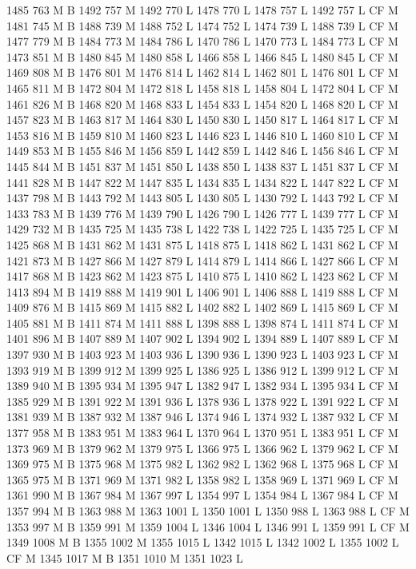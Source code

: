 {{{{{{{{{{{{{{{{{{{{{{{{{{{1485 763 M B
1492 757 M 1492 770 L
1478 770 L
1478 757 L
1492 757 L
CF M
1481 745 M B
1488 739 M 1488 752 L
1474 752 L
1474 739 L
1488 739 L
CF M
1477 779 M B
1484 773 M 1484 786 L
1470 786 L
1470 773 L
1484 773 L
CF M
1473 851 M B
1480 845 M 1480 858 L
1466 858 L
1466 845 L
1480 845 L
CF M
1469 808 M B
1476 801 M 1476 814 L
1462 814 L
1462 801 L
1476 801 L
CF M
1465 811 M B
1472 804 M 1472 818 L
1458 818 L
1458 804 L
1472 804 L
CF M
1461 826 M B
1468 820 M 1468 833 L
1454 833 L
1454 820 L
1468 820 L
CF M
1457 823 M B
1463 817 M 1464 830 L
1450 830 L
1450 817 L
1464 817 L
CF M
1453 816 M B
1459 810 M 1460 823 L
1446 823 L
1446 810 L
1460 810 L
CF M
1449 853 M B
1455 846 M 1456 859 L
1442 859 L
1442 846 L
1456 846 L
CF M
1445 844 M B
1451 837 M 1451 850 L
1438 850 L
1438 837 L
1451 837 L
CF M
1441 828 M B
1447 822 M 1447 835 L
1434 835 L
1434 822 L
1447 822 L
CF M
1437 798 M B
1443 792 M 1443 805 L
1430 805 L
1430 792 L
1443 792 L
CF M
1433 783 M B
1439 776 M 1439 790 L
1426 790 L
1426 777 L
1439 777 L
CF M
1429 732 M B
1435 725 M 1435 738 L
1422 738 L
1422 725 L
1435 725 L
CF M
1425 868 M B
1431 862 M 1431 875 L
1418 875 L
1418 862 L
1431 862 L
CF M
1421 873 M B
1427 866 M 1427 879 L
1414 879 L
1414 866 L
1427 866 L
CF M
1417 868 M B
1423 862 M 1423 875 L
1410 875 L
1410 862 L
1423 862 L
CF M
1413 894 M B
1419 888 M 1419 901 L
1406 901 L
1406 888 L
1419 888 L
CF M
1409 876 M B
1415 869 M 1415 882 L
1402 882 L
1402 869 L
1415 869 L
CF M
1405 881 M B
1411 874 M 1411 888 L
1398 888 L
1398 874 L
1411 874 L
CF M
1401 896 M B
1407 889 M 1407 902 L
1394 902 L
1394 889 L
1407 889 L
CF M
1397 930 M B
1403 923 M 1403 936 L
1390 936 L
1390 923 L
1403 923 L
CF M
1393 919 M B
1399 912 M 1399 925 L
1386 925 L
1386 912 L
1399 912 L
CF M
1389 940 M B
1395 934 M 1395 947 L
1382 947 L
1382 934 L
1395 934 L
CF M
1385 929 M B
1391 922 M 1391 936 L
1378 936 L
1378 922 L
1391 922 L
CF M
1381 939 M B
1387 932 M 1387 946 L
1374 946 L
1374 932 L
1387 932 L
CF M
1377 958 M B
1383 951 M 1383 964 L
1370 964 L
1370 951 L
1383 951 L
CF M
1373 969 M B
1379 962 M 1379 975 L
1366 975 L
1366 962 L
1379 962 L
CF M
1369 975 M B
1375 968 M 1375 982 L
1362 982 L
1362 968 L
1375 968 L
CF M
1365 975 M B
1371 969 M 1371 982 L
1358 982 L
1358 969 L
1371 969 L
CF M
1361 990 M B
1367 984 M 1367 997 L
1354 997 L
1354 984 L
1367 984 L
CF M
1357 994 M B
1363 988 M 1363 1001 L
1350 1001 L
1350 988 L
1363 988 L
CF M
1353 997 M B
1359 991 M 1359 1004 L
1346 1004 L
1346 991 L
1359 991 L
CF M
1349 1008 M B
1355 1002 M 1355 1015 L
1342 1015 L
1342 1002 L
1355 1002 L
CF M
1345 1017 M B
1351 1010 M 1351 1023 L
}}}}}}}}}}}}}}}}}}}}}}}}}}}
